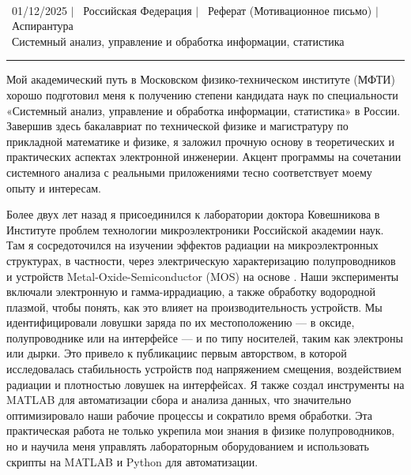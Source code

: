\documentclass[a4paper,11pt]{article}
\begin{document}
\begin{center}
    {\Huge {\fontsize{25}{30}\selectfont{Реза}} {\fontsize{25}{30}}} \\ 
    \vspace{3pt}
    {\small \raisebox{-0.2\height}\ {01/12/2025}} $|$
    {\small \raisebox{-0.2\height}\ {Российская Федерация}} $|$
    {\small \raisebox{-0.2\height}\ {Реферат (Мотивационное письмо)}} $|$
    {\small \raisebox{-0.2\height}\ {Аспирантура}}
    \\
    {\small \raisebox{-0.2\height}\ {Системный анализ, управление и обработка информации, статистика}} 
    \vspace{-10pt}
\end{center}
\vspace{-10pt}

\noindent\rule{\textwidth}{1pt}

Мой академический путь в Московском физико-техническом институте (МФТИ) хорошо подготовил меня к получению степени кандидата наук по специальности «Системный анализ, управление и обработка информации, статистика» в России. Завершив здесь бакалавриат по технической физике и магистратуру по прикладной математике и физике, я заложил прочную основу в теоретических и практических аспектах электронной инженерии. Акцент программы на сочетании системного анализа с реальными приложениями тесно соответствует моему опыту и интересам.

\vspace{10pt}

Более двух лет назад я присоединился к лаборатории доктора Ковешникова в Институте проблем технологии микроэлектроники Российской академии наук. Там я сосредоточился на изучении эффектов радиации на микроэлектронных структурах, в частности, через электрическую характеризацию полупроводников и устройств Metal-Oxide-Semiconductor (MOS) на основе . Наши эксперименты включали электронную и гамма-иррадиацию, а также обработку водородной плазмой, чтобы понять, как это влияет на производительность устройств. Мы идентифицировали ловушки заряда по их местоположению — в оксиде, полупроводнике или на интерфейсе — и по типу носителей, таким как электроны или дырки. Это привело к публикации\footnotemark[1] с первым авторством, в которой исследовалась стабильность устройств под напряжением смещения, воздействием радиации и плотностью ловушек на интерфейсах. Я также создал инструменты на MATLAB для автоматизации сбора и анализа данных, что значительно оптимизировало наши рабочие процессы и сократило время обработки. Эта практическая работа не только укрепила мои знания в физике полупроводников, но и научила меня управлять лабораторным оборудованием и использовать скрипты на MATLAB и Python для автоматизации.
\end{document}
